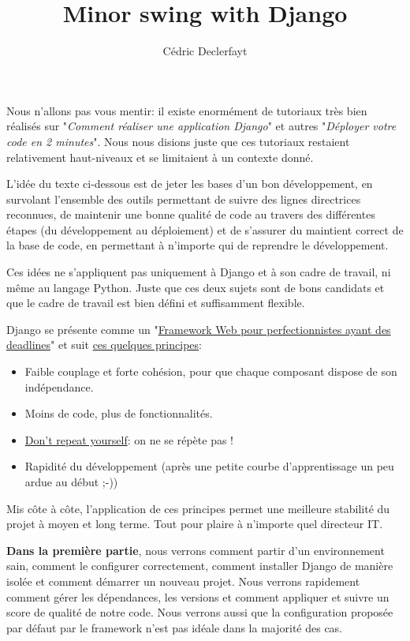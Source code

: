\documentclass[11pt]{amsbook}
\title{Minor swing with Django}
\author{Cédric Declerfayt}
\date{}
\begin{document}
\maketitle
\tableofcontents
Nous n’allons pas vous mentir: il existe enormément de tutoriaux très bien réalisés sur "\emph{Comment réaliser une application Django}" et autres "\emph{Déployer votre code en 2 minutes}". Nous nous disions juste que ces tutoriaux restaient relativement haut-niveaux et se limitaient à un contexte donné.


L’idée du texte ci-dessous est de jeter les bases d’un bon développement, en survolant l’ensemble des outils permettant de suivre des lignes directrices reconnues, de maintenir une bonne qualité de code au travers des différentes étapes (du développement au déploiement) et de s’assurer du maintient correct de la base de code, en permettant à n’importe qui de reprendre le développement.


Ces idées ne s’appliquent pas uniquement à Django et à son cadre de travail, ni même au langage Python. Juste que ces deux sujets sont de bons candidats et que le cadre de travail est bien défini et suffisamment flexible.


Django se présente comme un "\href{https://www.djangoproject.com/}{Framework Web pour perfectionnistes ayant des deadlines}" et suit \href{https://docs.djangoproject.com/en/dev/misc/design-philosophies/}{ces quelques principes}:


\begin{itemize}

\item Faible couplage et forte cohésion, pour que chaque composant dispose de son indépendance.

\item Moins de code, plus de fonctionnalités.

\item \href{https://fr.wikipedia.org/wiki/Ne_vous_r%C3%A9p%C3%A9tez_pas}{Don’t repeat yourself}: on ne se répète pas !

\item Rapidité du développement (après une petite courbe d’apprentissage un peu ardue au début ;-))

\end{itemize}


Mis côte à côte, l’application de ces principes permet une meilleure stabilité du projet à moyen et long terme. Tout pour plaire à n’importe quel directeur IT.


\textbf{Dans la première partie}, nous verrons comment partir d’un environnement sain, comment le configurer correctement, comment installer Django de manière isolée et comment démarrer un nouveau projet.
Nous verrons rapidement comment gérer les dépendances, les versions et comment appliquer et suivre un score de qualité de notre code.
Nous verrons aussi que la configuration proposée par défaut par le framework n’est pas idéale dans la majorité des cas.
\end{document}
